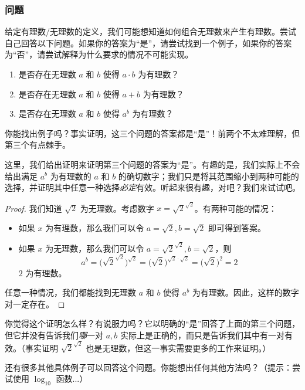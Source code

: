 \subsubsection*{问题}

给定有理数/无理数的定义，我们可能想知道如何组合无理数来产生有理数。尝试自己回答以下问题。如果你的答案为“是”，请尝试找到一个例子，如果你的答案为“否”，请尝试解释为什么要求的情况不可能实现。

\begin{enumerate}
    \item 是否存在无理数 $a$ 和 $b$ 使得 $a \cdot b$ 为有理数？
    \item 是否存在无理数 $a$ 和 $b$ 使得 $a + b$ 为有理数？
    \item 是否存在无理数 $a$ 和 $b$ 使得 $a^b$ 为有理数？
\end{enumerate}

你能找出例子吗？事实证明，这三个问题的答案都是“是”！前两个不太难理解，但第三个有点棘手。

这里，我们给出证明来证明第三个问题的答案为“是”。有趣的是，我们实际上不会给出满足 $a^b$ 为有理数的 $a$ 和 $b$ 的确切数字；我们只是将其范围缩小到两种可能的选择，并证明其中任意一种选择\textit{必定}有效。听起来很有趣，对吧？我们来试试吧。

\begin{proof}
    我们知道 $\sqrt{2}$ 为无理数。考虑数字 $x = \sqrt{2}^{\sqrt{2}}$。有两种可能的情况：
    \begin{itemize}
        \item 如果 $x$ 为有理数，那么我们可以令 $a = \sqrt{2}, b = \sqrt{2}$ 即可得到答案。
        \item 如果 $x$ 为无理数，那么我们可以令 $a = \sqrt{2}^{\sqrt{2}}, b = \sqrt{2}$，则
        \[a^b = \Bigg(\sqrt{2}^{\sqrt{2}}\Bigg)^{\sqrt{2}} = \Big(\sqrt{2}\Big)^{\sqrt{2} \cdot \sqrt{2}} = \Big(\sqrt{2}\Big)^2 = 2\]
        $2$ 为有理数。
    \end{itemize}
    任意一种情况，我们都能找到无理数 $a$ 和 $b$ 使得 $a^b$ 为有理数。因此，这样的数字对一定存在。
\end{proof}

你觉得这个证明怎么样？有说服力吗？它以明确的“是”回答了上面的第三个问题，但它并没有告诉我们\textit{哪}一对 $a, b$ 实际上是正确的，而只是告诉我们其中有一对有效。（事实证明 $\sqrt{2}^{\sqrt{2}}$ 也是无理数，但这一事实需要更多的工作来证明。）

还有很多其他具体例子可以回答这个问题。你能想出任何其他方法吗？（提示：尝试使用 $\log_{10}$ 函数...）